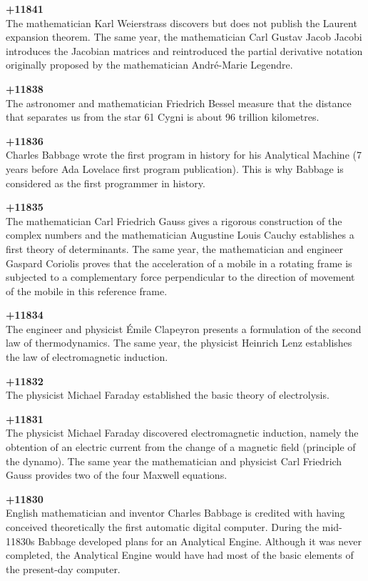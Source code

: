 \textbf{+11841}\\
The mathematician Karl Weierstrass discovers but does not publish the Laurent expansion theorem. The same year, the mathematician Carl Gustav Jacob Jacobi introduces the Jacobian matrices and reintroduced the partial derivative notation originally proposed by the mathematician André-Marie Legendre.

\textbf{+11838}\\
The astronomer and mathematician Friedrich Bessel measure that the distance that separates us from the star 61 Cygni is about 96 trillion kilometres.

\textbf{+11836}\\
Charles Babbage wrote the first program in history for his Analytical Machine (7 years before Ada Lovelace first program publication). This is why Babbage is considered as the first programmer in history.

\textbf{+11835}\\
The mathematician Carl Friedrich Gauss gives a rigorous construction of the complex numbers and the mathematician Augustine Louis Cauchy establishes a first theory of determinants. The same year, the mathematician and engineer Gaspard Coriolis proves that the acceleration of a mobile in a rotating frame is subjected to a complementary force perpendicular to the direction of movement of the mobile in this reference frame.

\textbf{+11834}\\
The engineer and physicist Émile Clapeyron presents a formulation of the second law of thermodynamics. The same year, the physicist Heinrich Lenz establishes the law of electromagnetic induction.

\textbf{+11832}\\
The physicist Michael Faraday established the basic theory of electrolysis.

\textbf{+11831}\\
The physicist Michael Faraday discovered electromagnetic induction, namely the obtention of an electric current from the change of a magnetic field (principle of the dynamo). The same year the mathematician and physicist Carl Friedrich Gauss provides two of the four Maxwell equations.

\textbf{+11830}\\
English mathematician and inventor Charles Babbage is credited with having conceived theoretically the first automatic digital computer. During the mid-11830s Babbage developed plans for an Analytical Engine. Although it was never completed, the Analytical Engine would have had most of the basic elements of the present-day computer.

